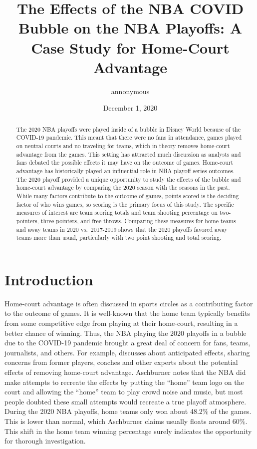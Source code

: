 \documentclass[12pt, letterpaper, titlepage]{article}
\title{The Effects of the NBA COVID Bubble on the NBA Playoffs: A Case Study for Home-Court Advantage}
\author{annonymous}
\date{December 1, 2020}
\begin{document}
\maketitle

\doublespace

\begin{abstract}
The 2020 NBA playoffs were played inside of a bubble in Disney World because of
the COVID-19 pandemic. This meant that there were no fans in attendance,
games played on neutral courts and no traveling for teams, which in theory
removes home-court advantage from the games. This setting has attracted much
discussion as analysts and fans debated the possible effects it may have on the
outcome of games. Home-court advantage has historically played an influential
role in NBA playoff series outcomes. The 2020 playoff provided a unique
opportunity to study the effects of the bubble and home-court
advantage by comparing the 2020 season with the seasons in the past.
While many factors contribute to the outcome of games, points scored
is the deciding factor of who wins games, so scoring is the primary focus
of this study. The specific measures of interest are team scoring totals and
team shooting percentage on two-pointers, three-pointers, and free throws.
Comparing these measures for home teams and away teams in 2020 vs.~2017-2019
shows that the 2020 playoffs favored away teams more than usual, particularly
with two point shooting and total scoring.
\end{abstract}


\hypertarget{sec:intro}{%
\section{Introduction}\label{sec:intro}}

Home-court advantage is often discussed in sports circles as a contributing
factor to the outcome of games. It is well-known that the home team typically
benefits from some competitive edge from playing at their home-court, resulting
in a better chance of winning. Thus, the NBA playing the 2020 playoffs in a
bubble due to the COVID-19 pandemic
brought a great deal of concern for fans, teams, journalists, and others.
For example, \citet{Aschburner} discusses about anticipated effects, sharing
concerns from former players, coaches and other experts about
the potential effects of removing home-court advantage. Aschburner notes that the
NBA did make attempts to recreate the effects by putting the ``home'' team logo on
the court and allowing the ``home'' team to play crowd noise and music, but most
people doubted these small attempts would recreate a true playoff atmosphere.
During the 2020 NBA playoffs, home teams only won about 48.2\% of the games. This
is lower than normal, which Aschburner claims usually floats around 60\%. This
shift in the home team winning percentage surely indicates the opportunity for
thorough investigation.
\end{document}
